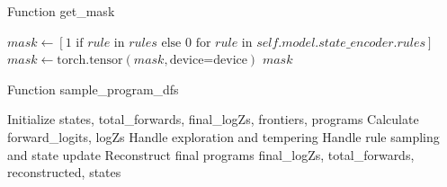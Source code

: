 \begin{algorithm}
\caption{Function get\_mask}
\begin{algorithmic}[1]
    \State $mask \gets [1 \text{ if } rule \text{ in } rules \text{ else } 0 \text{ for } rule \text{ in } self.model.state\_encoder.rules]$
    \State $mask \gets \text{torch.tensor}(mask, \text{device=device})$
    \State \Return $mask$
\EndFunction
\end{algorithmic}
\end{algorithm}

\begin{algorithm}
\caption{Function sample\_program\_dfs}
\begin{algorithmic}[1]
    \State Initialize states, total\_forwards, final\_logZs, frontiers, programs
        \State Calculate forward\_logits, logZs
        \State Handle exploration and tempering
                \State Handle rule sampling and state update
            \EndIf
        \EndFor
    \EndWhile
        \State Reconstruct final programs
        \State \Return final\_logZs, total\_forwards, reconstructed, states
    \EndIf
\EndFunction
\end{algorithmic}
\end{algorithm}

















































